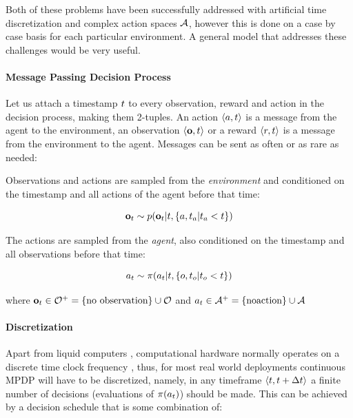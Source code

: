 Both of these problems have been successfully addressed with artificial time discretization and complex action spaces $\mathcal{A}$, however this is done on a case by case basis for each particular environment. A general model that addresses these challenges would be very useful.

\paragraph{Message Passing Decision Process}

Let us attach a timestamp $t$ to every observation, reward and action in the decision process, making them 2-tuples. An action $\langle a, t\rangle$ is a message from the agent to the environment, an observation $\langle \mathbf{o}, t \rangle$ or a reward $\langle r, t \rangle$ is a message from the environment
to the agent. Messages can be sent as often or as rare as needed:

Observations and actions are sampled from the \emph{environment} and conditioned on the timestamp and all actions of the agent before that time:

\begin{equation}
    \mathbf{o}_t \sim p(\mathbf{o}_t|t,\{a, t_a | t_a < t\})
\end{equation}

The actions are sampled from the \emph{agent}, also conditioned on the
timestamp and all observations before that time:

\begin{equation}
a_t \sim \pi(a_t|t, \{ o, t_o | t_o < t \})
\end{equation}

where $\mathbf{o}_t \in \mathcal{O}^{+} = \{\text{no observation} \} \cup \mathcal{O}$ and $a_t \in \mathcal{A}^{+} = \{\text{noaction} \} \cup \mathcal{A}$

\paragraph{Discretization}

Apart from liquid computers \cite{adamatzkyBriefHistoryLiquid2019}, computational hardware normally operates on a discrete time clock frequency \cite{publishingCPU2023}, thus, for most real world deployments continuous MPDP will have to be discretized, namely, in any timeframe $\langle t, t + \Delta t \rangle$ a finite number of decisions (evaluations of $\pi(a_t)$) should be made. This can be achieved by a decision schedule that is some combination of:

